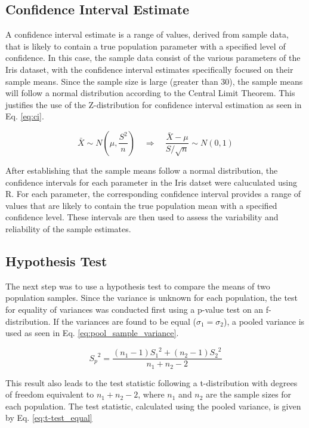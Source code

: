 \documentclass{article}
\begin{document}
\subsection{Confidence Interval Estimate}

A confidence interval estimate is a range of values, derived from sample data, that is likely to contain a true population parameter with a specified level of confidence. In this case, the sample data consist of the various parameters of the Iris dataset, with the confidence interval estimates specifically focused on their sample means. Since the sample size is large (greater than 30), the sample means will follow a normal distribution according to the Central Limit Theorem. This justifies the use of the Z-distribution for confidence interval estimation as seen in Eq. \ref{eq:ci}.

\begin{equation}
\bar{X} \sim N\left(\mu, \frac{S^2}{n}\right) \quad \Rightarrow \quad \frac{\bar{X} - \mu}{S/\sqrt{n}} \sim N(0,1) \label{eq:ci}
\end{equation}

After establishing that the sample means follow a normal distribution, the confidence intervals for each parameter in the Iris datset were caluculated using R. For each parameter, the corresponding confidence interval provides a range of values that are likely to contain the true population mean with a specified confidence level. These intervals are then used to assess the variability and reliability of the sample estimates. 

\subsection{Hypothesis Test}

The next step was to use a hypothesis test to compare the means of two population samples. Since the variance is unknown for each population, the test for equality of variances was conducted first using a p-value test on an f-distribution. If the variances are found to be equal ($\sigma_1 = \sigma_2$), a pooled variance is used as seen in Eq. \ref{eq:pool_sample_variance}.

\begin{equation}
	{S_p}^2 = \frac{(n_1 - 1) {S_1}^2 + (n_2 -1) {S_2}^2}{n_1 + n_2 -2}
	\label{eq:pool_sample_variance}
\end{equation}

This result also leads to the test statistic following a t-distribution with degrees of freedom equivalent to $n_1+n_2-2$, where $n_1$ and $n_2$ are the sample sizes for each population. The test statistic, calculated using the pooled variance, is given by Eq. \ref{eq:t-test_equal}
\end{document}
